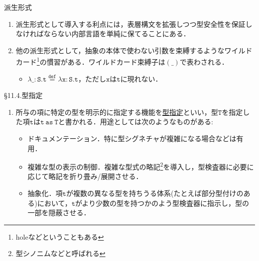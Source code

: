 \documentclass[9pt]{beamer}
\begin{document}
\begin{frame}{派生形式}
\begin{enumerate}\item 派生形式として導入する利点には，表層構文を拡張しつつ型安全性を保証しなければならない内部言語を単純に保てることにある．
    \item 他の派生形式として，抽象の本体で使わない引数を束縛するようなワイルドカード\footnote{holeなどということもある}の慣習がある．ワイルドカード束縛子は$(\_)$で表わされる．
    \begin{itemize}
    \item $\mathtt{\lambda \_: S. t\stackrel{def}{=}\lambda x: S. t}$，ただし$\mathtt{x}$は$\mathtt{t}$に現れない．
    \end{itemize}
\end{enumerate}
\end{frame}
\begin{frame}{\S11.4.型指定}
\begin{enumerate}
\item 所与の項に特定の型を明示的に指定する機能を\underline{型指定}といい，型$\mathtt{T}$を指定した項$\mathtt{t}$は$\mathtt{t\ as\ T}$と書かれる．用途としては次のようなものがある:
\begin{itemize}
\item ドキュメンテーション．特に型シグネチャが複雑になる場合などは有用．
\item 複雑な型の表示の制御．複雑な型式の略記\footnote{型シノニムなどと呼ばれる}を導入し，型検査器に必要に応じて略記を折り畳み/展開させる．
\item 抽象化．項$\mathtt{t}$が複数の異なる型を持ちうる体系(たとえば部分型付けのある)において，$\mathtt{t}$がより少数の型を持つかのよう型検査器に指示し，型の一部を隠蔽させる．
\end{itemize}
\end{enumerate}
\end{frame}
\end{document}
